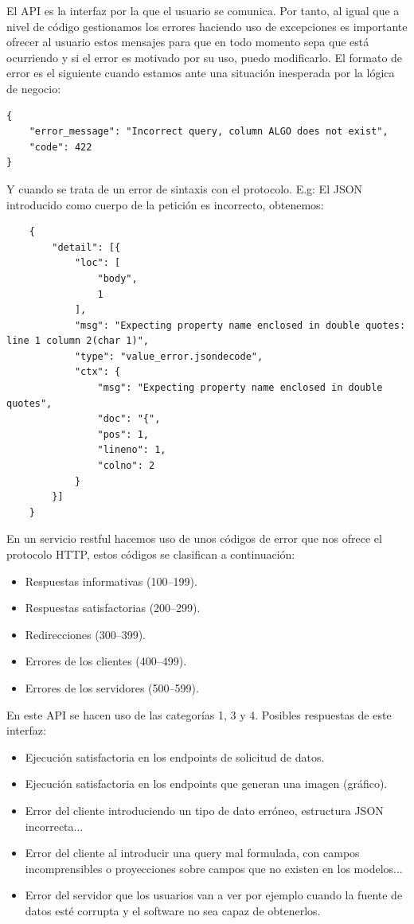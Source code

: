El API es la interfaz por la que el usuario se comunica. Por tanto, al igual que a nivel de código gestionamos los errores haciendo uso de excepciones es importante ofrecer al usuario estos mensajes para que en todo momento sepa que está ocurriendo y si el error es motivado por su uso, puedo modificarlo. El formato de error es el siguiente cuando estamos ante una situación inesperada por la lógica de negocio:
\begin{verbatim}
{
    "error_message": "Incorrect query, column ALGO does not exist",
    "code": 422
}
\end{verbatim}
Y cuando se trata de un error de sintaxis con el protocolo. E.g: El JSON introducido como cuerpo de la petición es incorrecto, obtenemos:
\begin{verbatim}
    {
        "detail": [{
            "loc": [
                "body",
                1
            ],
            "msg": "Expecting property name enclosed in double quotes: line 1 column 2(char 1)",
            "type": "value_error.jsondecode",
            "ctx": {
                "msg": "Expecting property name enclosed in double quotes",
                "doc": "{",
                "pos": 1,
                "lineno": 1,
                "colno": 2
            }
        }]
    }
\end{verbatim}

En un servicio restful hacemos uso de unos códigos de error que nos ofrece el protocolo HTTP, estos códigos se clasifican a continuación:
\begin{itemize}
    \item Respuestas informativas (100–199).
    \item Respuestas satisfactorias (200–299).
    \item Redirecciones (300–399).
    \item Errores de los clientes (400–499).
    \item Errores de los servidores (500–599).
\end{itemize}

En este API se hacen uso de las categorías 1, 3 y 4. Posibles respuestas de este interfaz:
\begin{itemize}
    \item {} Ejecución satisfactoria en los endpoints de solicitud de datos.
    \item {} Ejecución satisfactoria en los endpoints que generan una imagen (gráfico).
    \item {} Error del cliente introduciendo un tipo de dato erróneo, estructura JSON incorrecta...
    \item {} Error del cliente al introducir una query mal formulada, con campos incomprensibles o proyecciones sobre campos que no existen en los modelos...
    \item {} Error del servidor que los usuarios van a ver por ejemplo cuando la fuente de datos esté corrupta y el software no sea capaz de obtenerlos.
\end{itemize}

